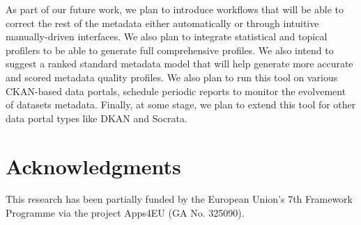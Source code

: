 \documentclass[runningheads,a4paper]{llncs}
\begin{document}
As part of our future work, we plan to introduce workflows that will be able to correct the rest of the metadata either automatically or through intuitive manually-driven interfaces. We also plan to integrate statistical and topical profilers to be able to generate full comprehensive profiles. We also intend to suggest a ranked standard metadata model that will help generate more accurate and scored metadata quality profiles. We also plan to run this tool on various CKAN-based data portals, schedule periodic reports to monitor the evolvement of datasets metadata. Finally, at some stage, we plan to extend this tool for other data portal types like DKAN and Socrata.


\section*{Acknowledgments}
This research has been partially funded by the European Union's 7th Framework Programme via the project Apps4EU (GA No. 325090).
\vspace{0.5cm}



\end{document}
